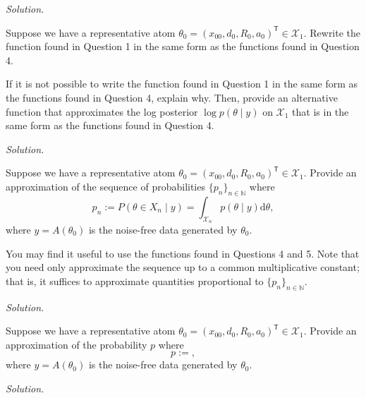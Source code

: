\documentclass{homework}
\newcommand*{\N}{\mathbb N}
\newcommand*{\rmd}{\mathrm{d}}
\begin{document}
\textit{Solution.} 


\pagebreak
\question*{}  
Suppose we have a representative atom $\theta_0=(x_{00},d_0,R_0,a_0)^{\mathsf T}\in\mathcal{X}_1$.
Rewrite the function found in Question 1 in the same form as 
the functions found in Question 4. 

If it is not possible to write the function found in Question 1 in the same form as 
the functions found in Question 4, explain why. Then, provide an alternative function 
that approximates the log posterior $\log p(\theta\mid y)$ on $\mathcal{X}_1$ 
that is in the same form as the functions found in Question 4.

\textit{Solution.} 


\pagebreak
\question*{}  
Suppose we have a representative atom $\theta_0=(x_{00},d_0,R_0,a_0)^{\mathsf T}\in\mathcal{X}_1$. 
Provide an approximation of the sequence of probabilities $\{p_{n}\}_{n\in\N}$ 
where 
\[
    p_n := P(\theta \in X_n \mid y) = \int_{\mathcal{X}_n} p(\theta\mid y) \rmd\theta, 
\]
where $y = A(\theta_0)$ is the noise-free data generated by $\theta_0$.

You may find it useful to use the functions found in Questions 4 and 5.
Note that you need only approximate the sequence up to a common multiplicative constant; 
that is, it suffices to approximate quantities proportional to $\{p_{n}\}_{n\in\N}$.

\textit{Solution.} 


\pagebreak
\question*{}  
Suppose we have a representative atom $\theta_0=(x_{00},d_0,R_0,a_0)^{\mathsf T}\in\mathcal{X}_1$. 
Provide an approximation of the probability $p$ 
where 
\[
    p := , 
\]
where $y = A(\theta_0)$ is the noise-free data generated by $\theta_0$.

\textit{Solution.} 
\end{document}
